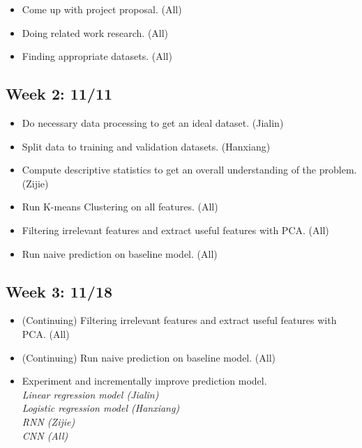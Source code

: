 \documentclass[english]{article}
\begin{document}
\begin{itemize}
    \item Come up with project proposal.  (All)
    \item Doing related work research.   (All)
    \item Finding appropriate datasets.  (All)

\end{itemize}

\subsection*{Week 2: 11/11}

\begin{itemize}
    \item Do necessary data processing to get an ideal dataset.  (Jialin)
    \item Split data to training and validation datasets.  (Hanxiang)
    \item Compute descriptive statistics to get an overall understanding of the problem.  (Zijie)
    \item Run K-means Clustering on all features.  (All)
    \item Filtering irrelevant features and extract useful features with PCA.  (All)
    \item Run naive prediction on baseline model.  (All)

\end{itemize}

\subsection*{Week 3: 11/18}

\begin{itemize}
    \item (Continuing) Filtering irrelevant features and extract useful features with PCA.  (All)
    \item (Continuing) Run naive prediction on baseline model.  (All)
    \item Experiment and incrementally improve prediction model.\\
        \emph{Linear regression model  (Jialin)}\\
        \emph{Logistic regression model  (Hanxiang)}\\
        \emph{RNN  (Zijie)}\\
        \emph{CNN  (All)}\\


\end{itemize}
\end{document}
